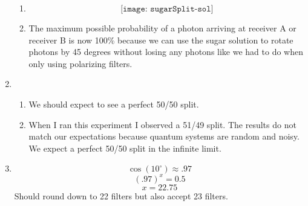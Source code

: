 \documentclass[12pt]{article}
\begin{document}
\begin{enumerate}[font=\bfseries]
\begin{enumerate}
        \item \[\texttt{[image: sugarSplit-sol]}\]
        \item The maximum possible probability of a photon arriving at receiver A or receiver B is now 100\% because we can use the sugar solution to rotate photons by 45 degrees without losing any photons like we had to do when only using polarizing filters.
    \end{enumerate}
    \item \begin{enumerate}
        \item We should expect to see a perfect 50/50 split.
        \item When I ran this experiment I observed a 51/49 split. The results do not match our expectations because quantum systems are random and noisy. We expect a perfect 50/50 split in the infinite limit.
    \end{enumerate}
    \item \[\cos({10^{\circ}}) \approx .97 \]
            \[(.97)^x = 0.5\]
            \[x = 22.75\]
            Should round down to 22 filters but also accept 23 filters.
\end{enumerate}
\end{document}
